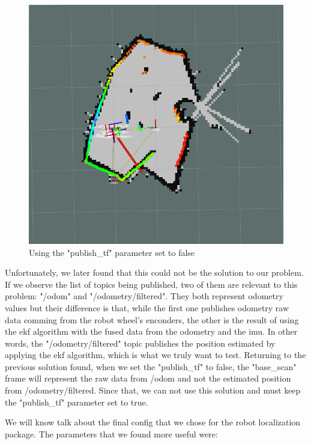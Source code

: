 \begin{figure}[h]
\centering
\includegraphics[scale=0.5]{./Images/tfPublishFalse}
\caption{Using the "publish\_tf" parameter set to false}
\label{fig:flowchart}
\end{figure}

Unfortunately, we later found that this could not be the solution to our problem. If we observe the list of topics being published, two of them are relevant to this problem: "/odom" and "/odometry/filtered". They both represent odometry values but their difference is that, while the first one publishes odometry raw data comming from the robot wheel's enconders, the other is the result of using the ekf algorithm with the fused data from the odometry and the imu. In other words, the "/odometry/filtered" topic publishes the position estimated by applying the ekf algorithm, which is what we truly want to test. Returning to the previous solution found, when we set the "publish\_tf" to false, the "base\_scan" frame will represent the raw data from /odom and not the estimated position from /odometry/filtered. Since that, we can not use this solution and must keep the "publish\_tf" parameter set to true.

We will know talk about the final config that we chose for the robot localization package. The parameters that we found more useful were:

